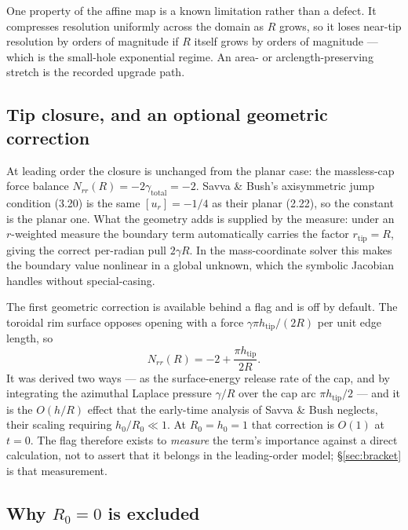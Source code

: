 \documentclass[11pt,a4paper]{article}
\begin{document}
One property of the affine map is a known limitation rather than a defect. It
compresses resolution uniformly across the domain as $R$ grows, so it loses
near-tip resolution by orders of magnitude if $R$ itself grows by orders of
magnitude --- which is the small-hole exponential regime. An area- or
arclength-preserving stretch is the recorded upgrade path.

\subsection{Tip closure, and an optional geometric correction}
\label{sec:tip}

At leading order the closure is unchanged from the planar case: the massless-cap
force balance $N_{rr}(R) = -2\gamma_{\text{total}} = -2$. Savva \& Bush's
axisymmetric jump condition (3.20) is the same $[u_{r}] = -1/4$ as their planar
(2.22), so the constant is the planar one. What the geometry adds is supplied by
the measure: under an $r$-weighted measure the boundary term automatically
carries the factor $r_{\mathrm{tip}} = R$, giving the correct per-radian pull
$2\gamma R$. In the mass-coordinate solver this makes the boundary value
nonlinear in a global unknown, which the symbolic Jacobian handles without
special-casing.

The first geometric correction is available behind a flag and is off by default.
The toroidal rim surface opposes opening with a force $\gamma\pi
h_{\mathrm{tip}}/(2R)$ per unit edge length, so
%
\begin{equation}
  N_{rr}(R) = -2 + \frac{\pi h_{\mathrm{tip}}}{2R} .
  \label{eq:tipcorr}
\end{equation}
%
It was derived two ways --- as the surface-energy release rate of the cap, and
by integrating the azimuthal Laplace pressure $\gamma/R$ over the cap arc
$\pi h_{\mathrm{tip}}/2$ --- and it is the $O(h/R)$ effect that the early-time
analysis of Savva \& Bush neglects, their scaling requiring $h_{0}/R_{0}\ll1$.
At $R_{0} = h_{0} = 1$ that correction is $O(1)$ at $t=0$. The flag therefore
exists to \emph{measure} the term's importance against a direct calculation, not
to assert that it belongs in the leading-order model;
\S\ref{sec:bracket} is that measurement.

\subsection{Why $R_{0}=0$ is excluded}
\end{document}
